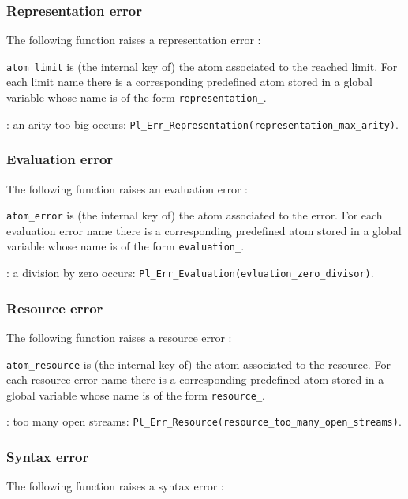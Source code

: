 \subsubsection{Representation error}
The following function raises a representation error :


\texttt{atom\_limit} is (the internal key of) the atom associated to the
reached limit. For each limit name  there is a
corresponding predefined atom stored in a global variable whose name is of
the form \texttt{representation\_}.

: an arity too big occurs:
\texttt{Pl\_Err\_Representation(representation\_max\_arity)}.

\subsubsection{Evaluation error}
The following function raises an evaluation error :


\texttt{atom\_error} is (the internal key of) the atom associated to the
error. For each evaluation error name  there is a
corresponding predefined atom stored in a global variable whose name is of
the form \texttt{evaluation\_}.

: a division by zero occurs:
\texttt{Pl\_Err\_Evaluation(evluation\_zero\_divisor)}.

\subsubsection{Resource error}
The following function raises a resource error :


\texttt{atom\_resource} is (the internal key of) the atom associated to the
resource. For each resource error name  there is a
corresponding predefined atom stored in a global variable whose name is of
the form \texttt{resource\_}.

: too many open streams:
\texttt{Pl\_Err\_Resource(resource\_too\_many\_open\_streams)}.

\subsubsection{Syntax error}
The following function raises a syntax error :


